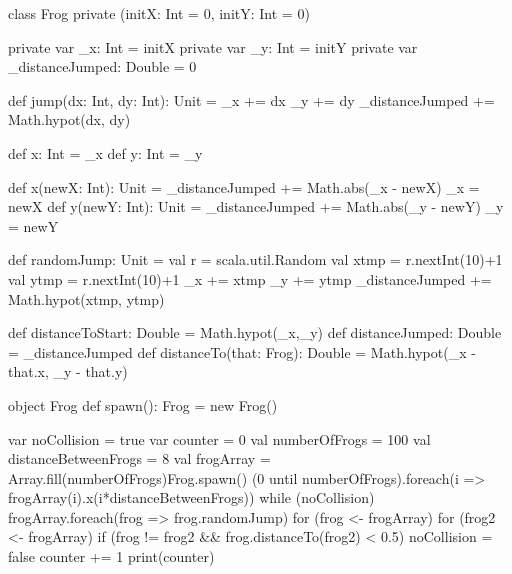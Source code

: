 \Subtask \begin{CodeSmall}
class Frog private (initX: Int = 0, initY: Int = 0) {
	private var _x: Int = initX
	private var _y: Int = initY
	private var _distanceJumped: Double = 0
	
	def jump(dx: Int, dy: Int): Unit = {
		_x += dx
		_y += dy
		_distanceJumped += Math.hypot(dx, dy)
	}
	
	def x: Int = _x
	def y: Int = _y
	
	def x(newX: Int): Unit = {
		_distanceJumped += Math.abs(_x - newX)
		_x = newX
	} 
	def y(newY: Int): Unit = {
		_distanceJumped += Math.abs(_y - newY)
		_y = newY
	} 
	
	def randomJump: Unit = {
		val r = scala.util.Random
		val xtmp = r.nextInt(10)+1
		val ytmp = r.nextInt(10)+1
		_x += xtmp
		_y += ytmp
		_distanceJumped += Math.hypot(xtmp, ytmp)
	}
	
	def distanceToStart: Double = Math.hypot(_x,_y)
	def distanceJumped: Double = _distanceJumped
	def distanceTo(that: Frog): Double = Math.hypot(_x - that.x, _y - that.y)
}

object Frog {
	def spawn(): Frog = new Frog()
}
\end{CodeSmall}

\Subtask \begin{CodeSmall}
var noCollision = true
var counter = 0
val numberOfFrogs = 100
val distanceBetweenFrogs = 8
val frogArray = Array.fill(numberOfFrogs){Frog.spawn()}
(0 until numberOfFrogs).foreach(i => frogArray(i).x(i*distanceBetweenFrogs))
while (noCollision) {
	frogArray.foreach(frog => frog.randomJump)
	for (frog <- frogArray) {
		for (frog2 <- frogArray) {
			if (frog != frog2 && frog.distanceTo(frog2) < 0.5) {
				noCollision = false
			}
		}
	}
	counter += 1
} 
print(counter)
\end{CodeSmall}

\ExtraTasks %

\AdvancedTasks %